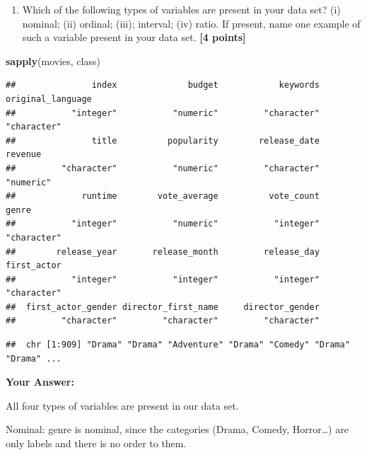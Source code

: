 \documentclass[
]{article}
\newenvironment{Shaded}{\begin{snugshade}}{\end{snugshade}}
\newcommand{\FunctionTok}[1]{\textcolor[rgb]{0.13,0.29,0.53}{\textbf{#1}}}
\newcommand{\NormalTok}[1]{#1}
\newcommand{\SpecialCharTok}[1]{\textcolor[rgb]{0.81,0.36,0.00}{\textbf{#1}}}
\providecommand{\tightlist}{%
  \setlength{\itemsep}{0pt}\setlength{\parskip}{0pt}}
\begin{document}
\begin{enumerate}
\def\labelenumi{\arabic{enumi}.}
\setcounter{enumi}{1}
\tightlist
\item
  Which of the following types of variables are present in your data
  set? (i) nominal; (ii) ordinal; (iii); interval; (iv) ratio. If
  present, name one example of such a variable present in your data set.
  \textbf{[4 points]}
\end{enumerate}

\begin{Shaded}
\begin{Highlighting}[]
\FunctionTok{sapply}\NormalTok{(movies, class)}
\end{Highlighting}
\end{Shaded}

\begin{verbatim}
##               index              budget            keywords   original_language 
##           "integer"           "numeric"         "character"         "character" 
##               title          popularity        release_date             revenue 
##         "character"           "numeric"         "character"           "numeric" 
##             runtime        vote_average          vote_count               genre 
##           "integer"           "numeric"           "integer"         "character" 
##        release_year       release_month         release_day         first_actor 
##           "integer"           "integer"           "integer"         "character" 
##  first_actor_gender director_first_name     director_gender 
##         "character"         "character"         "character"
\end{verbatim}

\begin{Shaded}
\end{Shaded}

\begin{verbatim}
##  chr [1:909] "Drama" "Drama" "Adventure" "Drama" "Comedy" "Drama" "Drama" ...
\end{verbatim}

\textbf{Your Answer:}

All four types of variables are present in our data set.

Nominal: genre is nominal, since the categories (Drama, Comedy,
Horror\ldots) are only labels and there is no order to them.
\end{document}
